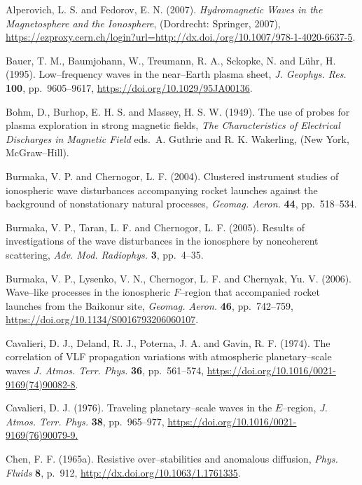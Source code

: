 \documentclass[a4paper,openany,12pt]{report}
\begin{document}
\begin{thebibliography}{100}

\bibitem{}
Alperovich, L. S. and Fedorov, E. N. (2007). {\it Hydromagnetic Waves in the Magnetosphere and the Ionosphere}, (Dordrecht: Springer, 2007), \url{https://ezproxy.cern.ch/login?url=http://dx.doi./org/10.1007/978-1-4020-6637-5}.

\bibitem{}
Bauer, T. M., Baumjohann, W., Treumann, R. A., Sckopke, N. and L\"uhr, H. (1995). Low--frequency waves in the near--Earth plasma sheet, {\it J. Geophys. Res.} \textbf{100}, pp.~9605--9617, \url{https://doi.org/10.1029/95JA00136}.

\bibitem{}
Bohm, D., Burhop, E. H. S. and Massey, H. S. W. (1949). The use of probes for plasma exploration in strong magnetic fields,  \emph{The Characteristics of Electrical Discharges in Magnetic Field} eds.~A. Guthrie and R. K. Wakerling, (New York, McGraw--Hill).

\bibitem{}
Burmaka, V. P. and Chernogor, L. F. (2004). Clustered instrument studies of ionospheric wave disturbances accompanying rocket launches against the background of nonstationary natural processes, 
{\it Geomag. Aeron.} \textbf{44}, pp.~518--534.

 \bibitem{}
Burmaka, V. P., Taran, L. F. and Chernogor, L. F. (2005). Results of investigations of the wave disturbances in the ionosphere by noncoherent scattering, {\it Adv. Mod. Radiophys.} \textbf{3}, pp.~4--35.

\bibitem{}
Burmaka, V. P., Lysenko, V. N., Chernogor, L. F. and Chernyak, Yu. V. (2006). Wave--like processes in the ionospheric $F$--region that accompanied rocket launches from the Baikonur site, {\it Geomag. Aeron.} \textbf{46}, pp.~742--759, \url{https://doi.org/10.1134/S0016793206060107}.

\bibitem{}
Cavalieri, D. J., Deland, R. J., Poterna, J. A. and Gavin, R. F. (1974). The correlation of VLF propagation variations with atmospheric planetary--scale waves {\it J. Atmos. Terr. Phys.} \textbf{36}, pp.~561--574, \url{https://doi.org/10.1016/0021-9169(74)90082-8}.

\bibitem{}
Cavalieri, D. J. (1976). Traveling planetary--scale waves in the $E$--region, {\it J. Atmos. Terr. Phys.} \textbf{38}, pp.~965--977, \url{https://doi.org/10.1016/0021-9169(76)90079-9.}

\bibitem{}
Chen, F. F. (1965a). Resistive over--stabilities and anomalous diffusion, \emph{Phys. Fluids} \textbf{8}, 
p.~912, \url{http://dx.doi.org/10.1063/1.1761335}.


\end{thebibliography}
\end{document}
